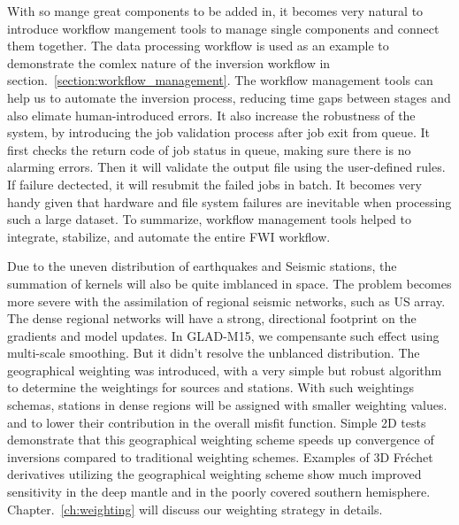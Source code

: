 With so mange great components to be added in, it becomes very natural to introduce
workflow mangement tools to manage single components and connect them together. The data processing
workflow is used as an example to demonstrate the comlex nature of the inversion workflow
in section.~\ref{section:workflow_management}. The workflow management tools can help us
to automate the inversion process, reducing time gaps between stages and also elimate
human-introduced errors. It also increase the robustness of the system, by introducing
the job validation process after job exit from queue. It first checks the return code
of job status in queue, making sure there is no alarming errors. Then it will validate the
output file using the user-defined rules. If failure dectected, it will resubmit the failed 
jobs in batch. It becomes very handy given that
hardware and file system failures are inevitable when processing such a large dataset.
To summarize, workflow management tools helped to integrate, stabilize, and automate
the entire FWI workflow.

Due to the uneven distribution of earthquakes and Seismic stations, the summation of
kernels will also be quite imblanced in space. The problem becomes more severe with
the assimilation of regional seismic networks, such as US array. The dense regional
networks will have a strong, directional footprint on the gradients and model updates.
In GLAD-M15, we compensante such effect using multi-scale smoothing. But it didn't resolve
the unblanced distribution. The geographical weighting was introduced, with a very simple
but robust algorithm to determine the weightings for sources and stations. With such 
weightings schemas, stations in dense regions will be assigned with smaller weighting values.
and to lower their contribution in the overall misfit function.
Simple 2D tests demonstrate that this geographical weighting scheme speeds up convergence of inversions
compared to traditional weighting schemes.
Examples of 3D Fr\'echet derivatives utilizing the geographical weighting scheme show much improved sensitivity in the deep mantle and in the poorly covered southern hemisphere.
Chapter.~\ref{ch:weighting} will discuss our weighting strategy in details.

